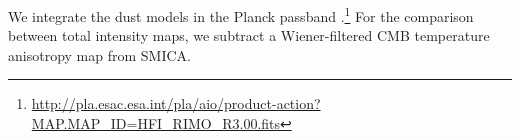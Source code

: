 \documentclass[twocolumn]{aastex631}
\begin{document}

We integrate the dust models in the Planck passband \citep{planck2013-p03d}.\footnote{\url{http://pla.esac.esa.int/pla/aio/product-action?MAP.MAP_ID=HFI_RIMO_R3.00.fits}} For the comparison between total intensity maps, we subtract a Wiener-filtered CMB temperature anisotropy map from SMICA.


\end{document}
